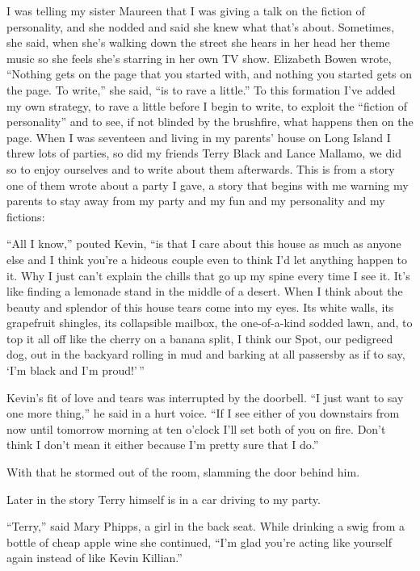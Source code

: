 \documentclass[
]{memoir}
\begin{document}
I was telling my sister Maureen that I was giving a talk on the fiction
of personality, and she nodded and said she knew what that's about.
Sometimes, she said, when she's walking down the street she hears in her
head her theme music so she feels she's starring in her own TV show.
Elizabeth Bowen wrote, ``Nothing gets on the page that you started with,
and nothing you started gets on the page. To write,'' she said, ``is to
rave a little.'' To this formation I've added my own strategy, to rave a
little before I begin to write, to exploit the ``fiction of
personality'' and to see, if not blinded by the brushfire, what happens
then on the page. When I was seventeen and living in my parents' house
on Long Island I threw lots of parties, so did my friends Terry Black
and Lance Mallamo, we did so to enjoy ourselves and to write about them
afterwards. This is from a story one of them wrote about a party I gave,
a story that begins with me warning my parents to stay away from my
party and my fun and my personality and my fictions:

``All I know,'' pouted Kevin, ``is that I care about this house as much
as anyone else and I think you're a hideous couple even to think I'd let
anything happen to it. Why I just can't explain the chills that go up my
spine every time I see it. It's like finding a lemonade stand in the
middle of a desert. When I think about the beauty and splendor of this
house tears come into my eyes. Its white walls, its grapefruit shingles,
its collapsible mailbox, the one-of-a-kind sodded lawn, and, to top it
all off like the cherry on a banana split, I think our Spot, our
pedigreed dog, out in the backyard rolling in mud and barking at all
passersby as if to say, `I'm black and I'm proud!'\,''

Kevin's fit of love and tears was interrupted by the doorbell. ``I just
want to say one more thing,'' he said in a hurt voice. ``If I see either
of you downstairs from now until tomorrow morning at ten o'clock I'll
set both of you on fire. Don't think I don't mean it either because I'm
pretty sure that I do.''

With that he stormed out of the room, slamming the door behind him.

Later in the story Terry himself is in a car driving to my party.

``Terry,'' said Mary Phipps, a girl in the back seat. While drinking a
swig from a bottle of cheap apple wine she continued, ``I'm glad you're
acting like yourself again instead of like Kevin Killian.''
\end{document}
